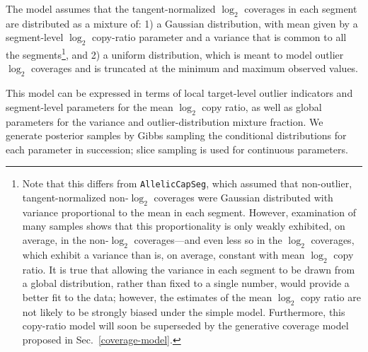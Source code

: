 \documentclass[nofootinbib,amssymb,amsmath]{revtex4}
\begin{document}
The model assumes that the tangent-normalized $\log_2$ coverages in each segment are distributed as a mixture of: 1) a Gaussian distribution, with mean given by a segment-level $\log_2$ copy-ratio parameter and a variance that is common to all the segments\footnote{Note that this differs from \texttt{AllelicCapSeg}, which assumed that non-outlier, tangent-normalized non-$\log_2$ coverages were Gaussian distributed with variance proportional to the mean in each segment.  However, examination of many samples shows that this proportionality is only weakly exhibited, on average, in the non-$\log_2$ coverages---and even less so in the $\log_2$ coverages, which exhibit a variance than is, on average, constant with mean $\log_2$ copy ratio.  It is true that allowing the variance in each segment to be drawn from a global distribution, rather than fixed to a single number, would  provide a better fit to the data; however, the estimates of the mean $\log_2$ copy ratio are not likely to be strongly biased under the simple model.  Furthermore, this copy-ratio model will soon be superseded by the generative coverage model proposed in Sec.~\ref{coverage-model}.}, and 2) a uniform distribution, which is meant to model outlier $\log_2$ coverages and is truncated at the minimum and maximum observed values.

This model can be expressed in terms of local target-level outlier indicators and segment-level parameters for the mean $\log_2$ copy ratio, as well as global parameters for the variance and outlier-distribution mixture fraction.  We generate posterior samples by Gibbs sampling the conditional distributions for each parameter in succession; slice sampling is used for continuous parameters.
\end{document}
